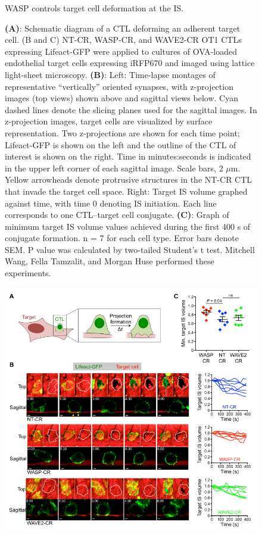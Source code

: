 \clearpage
\begin{figure}[htbp]
	\caption{WASP controls target cell deformation at the IS.}
    \caption*{\textbf{(A)}: Schematic diagram of a CTL deforming an adherent target cell. (B and C) NT-CR, WASP-CR, and WAVE2-CR OT1 CTLs expressing Lifeact-GFP were applied to cultures of OVA-loaded endothelial target cells expressing iRFP670 and imaged using lattice light-sheet microscopy. \textbf{(B)}: Left: Time-lapse montages of representative “vertically” oriented synapses, with z-projection images (top views) shown above and sagittal views below. Cyan dashed lines denote the slicing planes used for the sagittal images. In z-projection images, target cells are visualized by surface representation. Two z-projections are shown for each time point; Lifeact-GFP is shown on the left and the outline of the CTL of interest is shown on the right. Time in minutes:seconds is indicated in the upper left corner of each sagittal image. Scale bars, 2 $\mu$m. Yellow arrowheads denote protrusive structures in the NT-CR CTL that invade the target cell space. Right: Target IS volume graphed against time, with time 0 denoting IS initiation. Each line corresponds to one CTL–target cell conjugate. \textbf{(C)}: Graph of minimum target IS volume values achieved during the first 400 s of conjugate formation. n = 7 for each cell type. Error bars denote SEM. P value was calculated by two-tailed Student’s t test. Mitchell Wang, Fella Tamzalit, and Morgan Huse performed these experiments.}
    \label{fig:fig7lls}
\end{figure}
\clearpage
\begin{figure}[h!]
	\ContinuedFloat
    \centering
    \captionsetup{labelformat=adja-page}
    \includegraphics[width=\textwidth]{../figures/chapter2/fig7lls.png}
    \caption[]{}
\end{figure}

